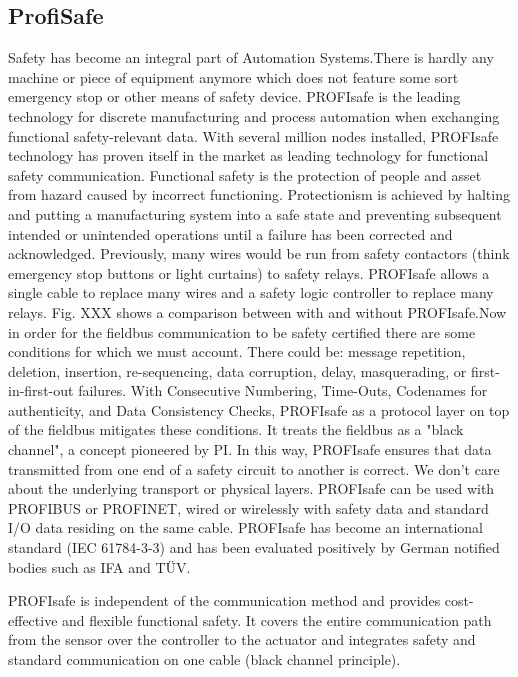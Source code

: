 \documentclass[conference]{IEEEtran}
\begin{document}
\subsection{ProfiSafe}
\label{subsec: profisafe}
Safety has become an integral part of Automation Systems.There is hardly any machine or piece of equipment anymore which does not feature some sort emergency stop or other means of safety device.
PROFIsafe is the leading technology for discrete manufacturing and process automation when exchanging functional safety-relevant data. With several million nodes installed, PROFIsafe technology has proven itself in the market as leading technology for functional safety communication. Functional safety is the protection of people and asset from hazard caused by incorrect functioning. Protectionism is achieved by halting and putting a manufacturing system into a safe state and preventing subsequent intended or unintended operations until a failure has been corrected and acknowledged. Previously, many wires would be run from safety contactors  (think emergency stop buttons or light curtains) to safety relays. PROFIsafe allows a single  cable to replace many wires and a safety logic controller to replace many relays. Fig. XXX shows a comparison between with and without PROFIsafe.Now  in order for the fieldbus communication to be safety certified there are some conditions  for which we must account. There could be: message repetition, deletion, insertion,  re-sequencing, data corruption, delay, masquerading, or first-in-first-out failures.  With Consecutive Numbering, Time-Outs, Codenames for authenticity, and Data Consistency  Checks, PROFIsafe as a protocol layer on top of the fieldbus mitigates these conditions. It  treats the fieldbus as a "black channel", a concept pioneered by PI. In this way,  PROFIsafe ensures that data transmitted from one end of a safety circuit to another  is correct. We don't care about the underlying transport or physical layers. PROFIsafe  can be used with PROFIBUS or PROFINET, wired or wirelessly with safety data  and standard I/O data residing on the same cable. PROFIsafe has become an international standard (IEC 61784-3-3) and has been evaluated positively by German notified bodies such as IFA and TÜV.

PROFIsafe is independent of the communication method and provides cost-effective and flexible functional safety. It covers the entire communication path from the sensor over the controller to the actuator and integrates safety and standard communication on one cable (black channel principle). 
\end{document}
